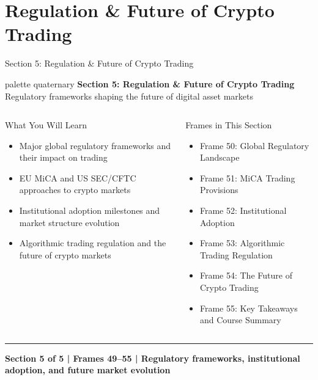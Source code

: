 \documentclass[8pt,aspectratio=169]{beamer}
\newcommand{\bottomnote}[1]{\vfill\vspace{-2mm}\textcolor{mllavender2}{\rule{\textwidth}{0.4pt}}\vspace{1mm}\footnotesize\textbf{#1}}
\begin{document}
\section{Regulation \& Future of Crypto Trading}

\begin{frame}{Section 5: Regulation \& Future of Crypto Trading}
\begin{beamercolorbox}[sep=12pt,center,rounded=true,shadow=true]{palette quaternary}
  {\Large\bfseries Section 5: Regulation \& Future of Crypto Trading}\\[4pt]
  {\normalsize Regulatory frameworks shaping the future of digital asset markets}
\end{beamercolorbox}

\vspace{4mm}
\begin{columns}[T]
\begin{block}{What You Will Learn}
\begin{itemize}\setlength{\itemsep}{2pt}
  \item Major global regulatory frameworks and their impact on trading
  \item EU MiCA and US SEC/CFTC approaches to crypto markets
  \item Institutional adoption milestones and market structure evolution
  \item Algorithmic trading regulation and the future of crypto markets
\end{itemize}
\end{block}
\begin{block}{Frames in This Section}
\begin{itemize}\setlength{\itemsep}{2pt}
  \item Frame 50: Global Regulatory Landscape
  \item Frame 51: MiCA Trading Provisions
  \item Frame 52: Institutional Adoption
  \item Frame 53: Algorithmic Trading Regulation
  \item Frame 54: The Future of Crypto Trading
  \item Frame 55: Key Takeaways and Course Summary
\end{itemize}
\end{block}
\end{columns}
\bottomnote{Section 5 of 5 | Frames 49--55 | Regulatory frameworks, institutional adoption, and future market evolution}
\end{frame}
\end{document}
